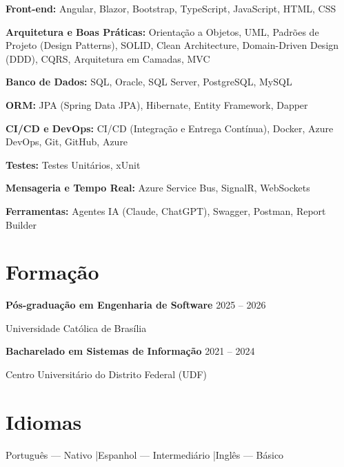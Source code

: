\documentclass[11pt,a4paper]{article}
\begin{document}
\textbf{Front-end:} Angular, Blazor, Bootstrap, TypeScript, JavaScript, HTML, CSS

\vspace{0.12cm}

\textbf{Arquitetura e Boas Práticas:} Orientação a Objetos, UML, Padrões de Projeto (Design Patterns), SOLID, Clean Architecture, Domain-Driven Design (DDD), CQRS, Arquitetura em Camadas, MVC

\vspace{0.12cm}

\textbf{Banco de Dados:} SQL, Oracle, SQL Server, PostgreSQL, MySQL

\vspace{0.12cm}

\textbf{ORM:} JPA (Spring Data JPA), Hibernate, Entity Framework, Dapper

\vspace{0.12cm}

\textbf{CI/CD e DevOps:} CI/CD (Integração e Entrega Contínua), Docker, Azure DevOps, Git, GitHub, Azure

\vspace{0.12cm}

\textbf{Testes:} Testes Unitários, xUnit

\vspace{0.12cm}

\textbf{Mensageria e Tempo Real:} Azure Service Bus, SignalR, WebSockets

\vspace{0.12cm}

\textbf{Ferramentas:} Agentes IA (Claude, ChatGPT), Swagger, Postman, Report Builder

\section{Formação}

\textbf{Pós-graduação em Engenharia de Software}
\hfill 2025 -- 2026

Universidade Católica de Brasília

\vspace{0.2cm}

\textbf{Bacharelado em Sistemas de Informação}
\hfill 2021 -- 2024

Centro Universitário do Distrito Federal (UDF)

\section{Idiomas}

Português — Nativo \quad|\quad Espanhol — Intermediário \quad|\quad Inglês — Básico
\end{document}
